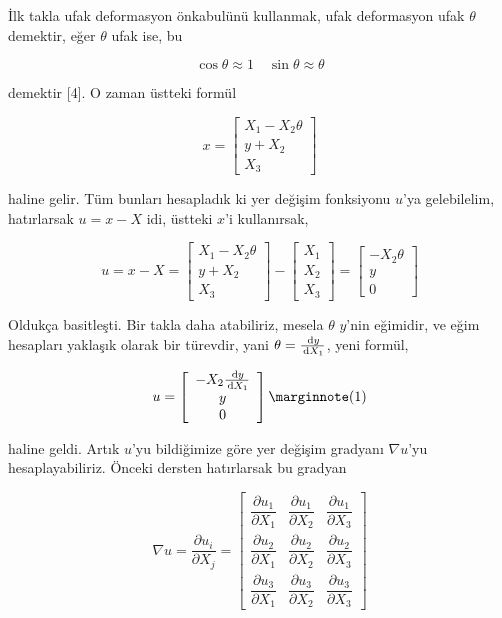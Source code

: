 \documentclass[12pt,fleqn]{article}\usepackage{../../common}
\begin{document}
İlk takla ufak deformasyon önkabulünü kullanmak, ufak deformasyon ufak $\theta$
demektir, eğer $\theta$ ufak ise, bu

$$
\cos\theta \approx 1 \quad \sin\theta \approx \theta
$$

demektir [4]. O zaman üstteki formül

$$
x = \left[\begin{array}{c}
X_1 - X_2 \theta \\ y + X_2 \\ X_3
\end{array}\right]
$$

haline gelir. Tüm bunları hesapladık ki yer değişim fonksiyonu $u$'ya
gelebilelim, hatırlarsak $u = x - X$ idi, üstteki $x$'i kullanırsak,

$$
u = x - X =
\left[\begin{array}{c}
X_1 - X_2 \theta \\ y + X_2 \\ X_3
\end{array}\right] -
\left[\begin{array}{ccc}
X_1 \\ X_2 \\ X_3
\end{array}\right] =
\left[\begin{array}{ccc}
-X_2 \theta \\ y \\ 0
\end{array}\right] 
$$

Oldukça basitleşti. Bir takla daha atabiliriz, mesela $\theta$ $y$'nin eğimidir,
ve eğim hesapları yaklaşık olarak bir türevdir, yani $\theta = \frac{\,\mathrm{d} y}{\,\mathrm{d} X_1}$,
yeni formül,

$$
u = \left[\begin{array}{ccc}
-X_2 \frac{\ud y}{\ud X_1} \\ y \\ 0
\end{array}\right]
\mlabel{1}
$$

haline geldi. Artık $u$'yu bildiğimize göre yer değişim gradyanı $\nabla u$'yu
hesaplayabiliriz. Önceki dersten hatırlarsak bu gradyan

$$
\renewcommand*{\arraystretch}{2.5}
\nabla u = \frac{\partial u_i}{\partial X_j} =
\left[\begin{array}{ccc}
\dfrac{\partial u_1}{\partial X_1} & \dfrac{\partial u_1}{\partial X_2} & \dfrac{\partial u_1}{\partial X_3} \\
\dfrac{\partial u_2}{\partial X_1} & \dfrac{\partial u_2}{\partial X_2} & \dfrac{\partial u_2}{\partial X_3} \\
\dfrac{\partial u_3}{\partial X_1} & \dfrac{\partial u_3}{\partial X_2} & \dfrac{\partial u_3}{\partial X_3} 
\end{array}\right]
$$
\end{document}
